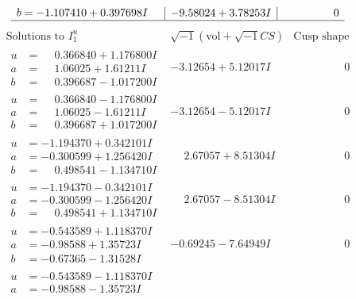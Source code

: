 \documentclass[1p]{elsarticle_modified}
\theoremstyle{definition}
\newcommand{\I}{\sqrt{-1}}
\begin{document}
$$\begin{array}{c|c|c}
\begin{aligned}
b &= -1.107410 + 0.397698 I\end{aligned}
 & -9.58024 + 3.78253 I & \phantom{-0.000000 } 0\\
 \hline 
 \end{array}$$\newpage$$\begin{array}{c|c|c}  
\text{Solutions to }I^u_{1}& \I (\text{vol} + \sqrt{-1}CS) & \text{Cusp shape}\\
 \hline 
\begin{aligned}
u &= \phantom{-}0.366840 + 1.176800 I \\
a &= \phantom{-}1.06025 + 1.61211 I \\
b &= \phantom{-}0.396687 - 1.017200 I\end{aligned}
 & -3.12654 + 5.12017 I & \phantom{-0.000000 } 0 \\ \hline\begin{aligned}
u &= \phantom{-}0.366840 - 1.176800 I \\
a &= \phantom{-}1.06025 - 1.61211 I \\
b &= \phantom{-}0.396687 + 1.017200 I\end{aligned}
 & -3.12654 - 5.12017 I & \phantom{-0.000000 } 0 \\ \hline\begin{aligned}
u &= -1.194370 + 0.342101 I \\
a &= -0.300599 + 1.256420 I \\
b &= \phantom{-}0.498541 - 1.134710 I\end{aligned}
 & \phantom{-}2.67057 + 8.51304 I & \phantom{-0.000000 } 0 \\ \hline\begin{aligned}
u &= -1.194370 - 0.342101 I \\
a &= -0.300599 - 1.256420 I \\
b &= \phantom{-}0.498541 + 1.134710 I\end{aligned}
 & \phantom{-}2.67057 - 8.51304 I & \phantom{-0.000000 } 0 \\ \hline\begin{aligned}
u &= -0.543589 + 1.118370 I \\
a &= -0.98588 + 1.35723 I \\
b &= -0.67365 - 1.31528 I\end{aligned}
 & -0.69245 - 7.64949 I & \phantom{-0.000000 } 0 \\ \hline\begin{aligned}
u &= -0.543589 - 1.118370 I \\
a &= -0.98588 - 1.35723 I \\

\end{aligned}
\end{array}$$
\end{document}
